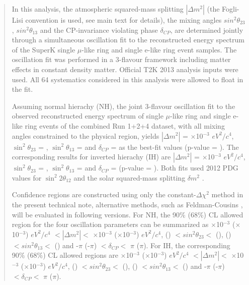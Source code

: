 \begin{frontmatter}
\begin{abstract}
In this analysis, 
the atmospheric squared-mass splitting $|\Delta m^{2}|$ (the Fogli-Lisi convention is used, see main text for details),
the mixing angles $sin^{2}\theta_{23}$, $sin^{2}\theta_{13}$ 
and the CP-invariance violating phase $\delta_{CP}$,
are determined jointly through a simultaneous oscillation fit to the reconstructed
energy spectrum of the SuperK single $\mu$-like ring and single e-like ring event samples.
The oscillation fit was performed in a 3-flavour framework
including matter effects in constant density matter.
Official T2K 2013 analysis inputs were used.
All 64 systematics considered in this analysis were allowed to float in the fit.


Assuming normal hierachy (NH), 
the joint 3-flavour oscillation fit to
the observed reconstructed energy spectrum of single $\mu$-like ring and single e-like ring
events of the combined Run 1+2+4 dataset,
with all mixing angles constrained to the physical region,
yields
$|\Delta m^{2}|$ = {\color{red}{x.xxx}}$\times$10$^{-3}$ $eV^{2}/c^{4}$,
$\sin^{2}\theta_{23}$ = {\color{red}{x.xxx}},
$\sin^{2}\theta_{13}$ = {\color{red}{x.xxx}} and
$\delta_{CP}$ = {\color{red}{x.xxx}}
as the best-fit values (p-value = {\color{red}{x.xx}}).
The corresponding results for inverted hierachy (IH) are
$|\Delta m^{2}|$ = {\color{red}{x.xxx}} $\times$10$^{-3}$ $eV^{2}/c^{4}$,
$\sin^{2}\theta_{23}$ = {\color{red}{x.xxx}},
$\sin^{2}\theta_{13}$ = {\color{red}{x.xxx}} and
$\delta_{CP}$ = {\color{red}{x.xxx}}
(p-value = {\color{red}{x.xx}}).
Both fits used 2012 PDG values for
$\sin^{2}2\theta_{12}$ and the solar squared-mass splitting $\delta m^{2}$ \cite{PDG}.

Confidence regions are constructed using only the constant-$\Delta\chi^2$ method in the present technical note,
alternative methods, such as Feldman-Cousins \cite{FeldmanCousins}, will be evaluated in following versions.
For NH, the 90\% (68\%) CL allowed region for the four oscillation parameters can be summarized as
{\color{red}{x.xxx}}$\times$10$^{-3}$ ({\color{red}{x.xxx}}$\times$10$^{-3}$) $eV^{2}/c^{4}$
$< |\Delta m^{2}| < $
{\color{red}{x.xxx}}$\times$10$^{-3}$ ({\color{red}{x.xxx}}$\times$10$^{-3}$) $eV^{2}/c^{4}$,
{\color{red}{x.xxx}} ({\color{red}{x.xxx}}) $< sin^{2}\theta_{23} <$ {\color{red}{x.xxx}} ({\color{red}{x.xxx}}),
{\color{red}{x.xxx}} ({\color{red}{x.xxx}}) $< sin^{2}\theta_{13} <$ {\color{red}{x.xxx}} ({\color{red}{x.xxx}}) and
-$\pi$ (-$\pi$) $< \delta_{CP} <$ $\pi$ ($\pi$).
For IH, the corresponding 90\% (68\%) CL allowed regions are
{\color{red}{x.xxx}} $\times$10$^{-3}$ ({\color{red}{x.xxx}}$\times$10$^{-3}$) $eV^{2}/c^{4}$
$< |\Delta m^{2}| < $
{\color{red}{x.xxx}} $\times$10$^{-3}$ ({\color{red}{x.xxx}}$\times$10$^{-3}$) $eV^{2}/c^{4}$,
 {\color{red}{x.xxx}} ({\color{red}{x.xxx}}) $< sin^{2}\theta_{23} <$ {\color{red}{x.xxx}} ({\color{red}{x.xxx}}),
{\color{red}{x.xxx}} ({\color{red}{x.xxx}}) $< sin^{2}\theta_{13} <$ {\color{red}{x.xxx}} ({\color{red}{x.xxx}}) and
-$\pi$ (-$\pi$) $< \delta_{CP} <$ $\pi$ ($\pi$).

\end{abstract}

%
%

\end{frontmatter}

